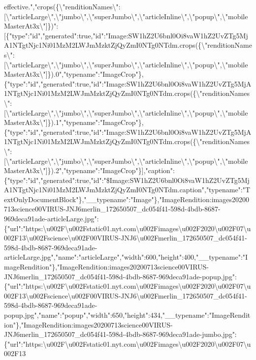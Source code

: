 effective.","crops(\{\textbackslash{}"renditionNames\textbackslash{}":{[}\textbackslash{}"articleLarge\textbackslash{}",\textbackslash{}"jumbo\textbackslash{}",\textbackslash{}"superJumbo\textbackslash{}",\textbackslash{}"articleInline\textbackslash{}",\textbackslash{}"popup\textbackslash{}",\textbackslash{}"mobileMasterAt3x\textbackslash{}"{]}\})":{[}\{"type":"id","generated":true,"id":"Image:SW1hZ2U6bnl0Oi8vaW1hZ2UvZTg5MjA1NTgtNjc1Ni01MzM2LWJmMzktZjQyZmI0NTg0NTdm.crops(\{\textbackslash{}"renditionNames\textbackslash{}":{[}\textbackslash{}"articleLarge\textbackslash{}",\textbackslash{}"jumbo\textbackslash{}",\textbackslash{}"superJumbo\textbackslash{}",\textbackslash{}"articleInline\textbackslash{}",\textbackslash{}"popup\textbackslash{}",\textbackslash{}"mobileMasterAt3x\textbackslash{}"{]}\}).0","typename":"ImageCrop"\},\{"type":"id","generated":true,"id":"Image:SW1hZ2U6bnl0Oi8vaW1hZ2UvZTg5MjA1NTgtNjc1Ni01MzM2LWJmMzktZjQyZmI0NTg0NTdm.crops(\{\textbackslash{}"renditionNames\textbackslash{}":{[}\textbackslash{}"articleLarge\textbackslash{}",\textbackslash{}"jumbo\textbackslash{}",\textbackslash{}"superJumbo\textbackslash{}",\textbackslash{}"articleInline\textbackslash{}",\textbackslash{}"popup\textbackslash{}",\textbackslash{}"mobileMasterAt3x\textbackslash{}"{]}\}).1","typename":"ImageCrop"\},\{"type":"id","generated":true,"id":"Image:SW1hZ2U6bnl0Oi8vaW1hZ2UvZTg5MjA1NTgtNjc1Ni01MzM2LWJmMzktZjQyZmI0NTg0NTdm.crops(\{\textbackslash{}"renditionNames\textbackslash{}":{[}\textbackslash{}"articleLarge\textbackslash{}",\textbackslash{}"jumbo\textbackslash{}",\textbackslash{}"superJumbo\textbackslash{}",\textbackslash{}"articleInline\textbackslash{}",\textbackslash{}"popup\textbackslash{}",\textbackslash{}"mobileMasterAt3x\textbackslash{}"{]}\}).2","typename":"ImageCrop"\}{]},"caption":\{"type":"id","generated":true,"id":"\$Image:SW1hZ2U6bnl0Oi8vaW1hZ2UvZTg5MjA1NTgtNjc1Ni01MzM2LWJmMzktZjQyZmI0NTg0NTdm.caption","typename":"TextOnlyDocumentBlock"\},"\_\_typename":"Image"\},"ImageRendition:images20200713science00VIRUS-JNJ6merlin\_172650507\_dc054f41-598d-4bdb-8687-969deca91ade-articleLarge.jpg":\{"url":"https:\textbackslash{}u002F\textbackslash{}u002Fstatic01.nyt.com\textbackslash{}u002Fimages\textbackslash{}u002F2020\textbackslash{}u002F07\textbackslash{}u002F13\textbackslash{}u002Fscience\textbackslash{}u002F00VIRUS-JNJ6\textbackslash{}u002Fmerlin\_172650507\_dc054f41-598d-4bdb-8687-969deca91ade-articleLarge.jpg","name":"articleLarge","width":600,"height":400,"\_\_typename":"ImageRendition"\},"ImageRendition:images20200713science00VIRUS-JNJ6merlin\_172650507\_dc054f41-598d-4bdb-8687-969deca91ade-popup.jpg":\{"url":"https:\textbackslash{}u002F\textbackslash{}u002Fstatic01.nyt.com\textbackslash{}u002Fimages\textbackslash{}u002F2020\textbackslash{}u002F07\textbackslash{}u002F13\textbackslash{}u002Fscience\textbackslash{}u002F00VIRUS-JNJ6\textbackslash{}u002Fmerlin\_172650507\_dc054f41-598d-4bdb-8687-969deca91ade-popup.jpg","name":"popup","width":650,"height":434,"\_\_typename":"ImageRendition"\},"ImageRendition:images20200713science00VIRUS-JNJ6merlin\_172650507\_dc054f41-598d-4bdb-8687-969deca91ade-jumbo.jpg":\{"url":"https:\textbackslash{}u002F\textbackslash{}u002Fstatic01.nyt.com\textbackslash{}u002Fimages\textbackslash{}u002F2020\textbackslash{}u002F07\textbackslash{}u002F13\textback